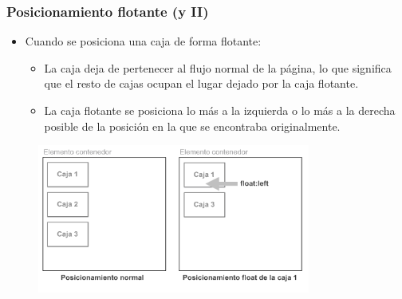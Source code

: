 \begin{frame}
\frametitle{Posicionamiento flotante (y II)}

\begin{itemize}
  \item Cuando se posiciona una caja de forma flotante:
  \begin{itemize}
    \item La caja deja de pertenecer al flujo normal de la página, lo que significa que el resto de cajas ocupan el lugar dejado por la caja flotante.
    \item La caja flotante se posiciona lo más a la izquierda o lo más a la derecha posible de la posición en la que se encontraba originalmente.
  \end{itemize}
\end{itemize}


\begin{center}
\begin{figure}[p]
\includegraphics[width=0.8\textwidth]{figs/f0508.png}
\end{figure}
\end{center}

\end{frame}



